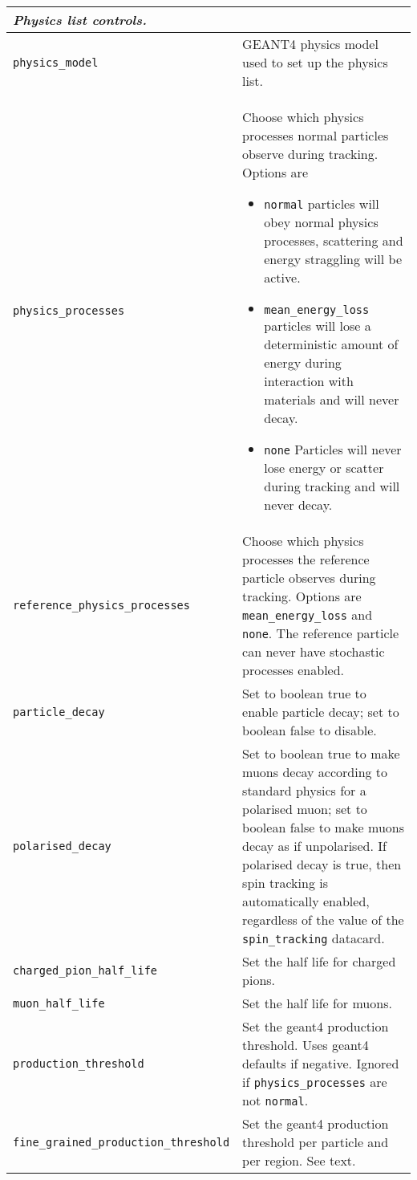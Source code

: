 \begin{table*}
\begin{center}
\caption{Physics list control parameters.}
\begin{tabularx}{\textwidth}{lX}
\hline
\multicolumn{2}{l}{\emph{Physics list controls.}} \\
\hline
\verb|physics_model| & GEANT4 physics model used to set up the physics list.\\
\verb|physics_processes| & Choose which physics processes normal particles observe during tracking. Options are 
                            \begin{itemize}
                            \item \verb|normal| particles will obey normal physics processes, scattering and energy straggling will be active.
                            \item \verb|mean_energy_loss| particles will lose a deterministic amount of energy during interaction with materials and will never decay.
                            \item \verb|none| Particles will never lose energy or scatter during tracking and will never decay.
                            \end{itemize} \\
\verb|reference_physics_processes| & Choose which physics processes the reference particle observes during tracking. Options are \verb|mean_energy_loss| and \verb|none|. The reference particle can never have stochastic processes enabled.\\
\verb|particle_decay| & Set to boolean true to enable particle decay; set to boolean false to disable.\\
\verb|polarised_decay| & Set to boolean true to make muons decay according to standard physics for a polarised muon; set to boolean false to make muons decay as if unpolarised. If polarised decay is true, then spin tracking is automatically enabled, regardless of the value of the \verb|spin_tracking| datacard.\\
\verb|charged_pion_half_life| & Set the half life for charged pions.\\
\verb|muon_half_life| & Set the half life for muons.\\
\verb|production_threshold| & Set the geant4 production threshold. Uses geant4 defaults if negative. Ignored if \verb|physics_processes| are not \verb|normal|. \\
\verb|fine_grained_production_threshold| & Set the geant4 production threshold per particle and per region. See text. \\

\end{tabularx}
\end{center}
\end{table*}

